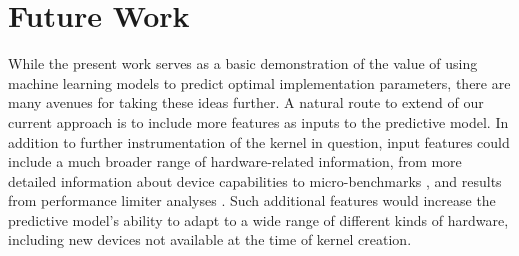 \documentclass{sig-alternate}
\begin{document}
% 
% 
% 
% 
% 
% 
% 
% 
% 
% 
% 
% 

\section{Future Work}
\label{sec:fw}

While the present work serves as a basic demonstration of the value of using
machine learning models to predict optimal implementation parameters, there are
many avenues for taking these ideas further. A natural route to extend of our
current approach is to include more features as inputs to the predictive model.
In addition to further instrumentation of the kernel in question, input
features could include a much broader range of hardware-related information,
from more detailed information about device capabilities to micro-benchmarks
\citep{wong2010demystifying}, and results from performance limiter analyses
\citep{micikevicius2010analysis}. Such additional features would increase the
predictive model's ability to adapt to a wide range of different kinds of
hardware, including new devices not available at the time of kernel creation.
\end{document}
